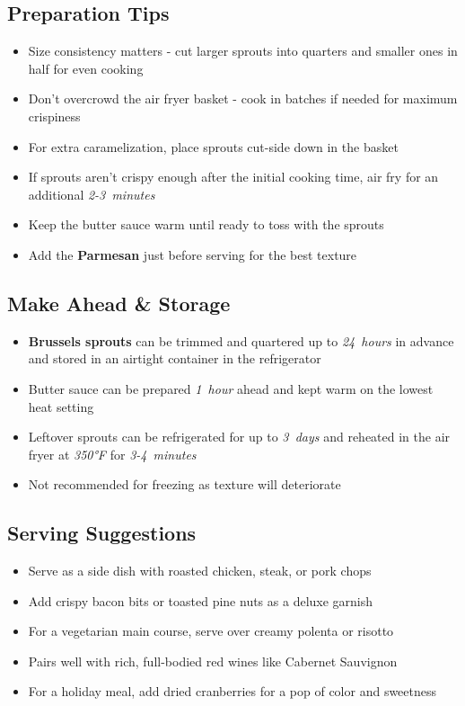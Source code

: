\documentclass[11pt,letterpaper]{article}
\begin{document}
{\begin{multicols}{2}
\subsection*{Preparation Tips}
\begin{itemize}
    \item Size consistency matters - cut larger sprouts into quarters and smaller ones in half for even cooking
    \item Don't overcrowd the air fryer basket - cook in batches if needed for maximum crispiness
    \item For extra caramelization, place sprouts cut-side down in the basket
    \item If sprouts aren't crispy enough after the initial cooking time, air fry for an additional \textit{2-3~minutes}
    \item Keep the butter sauce warm until ready to toss with the sprouts
    \item Add the \textbf{Parmesan} just before serving for the best texture
\end{itemize}

\subsection*{Make Ahead \& Storage}
\begin{itemize}
    \item \textbf{Brussels sprouts} can be trimmed and quartered up to \textit{24~hours} in advance and stored in an airtight container in the refrigerator
    \item Butter sauce can be prepared \textit{1~hour} ahead and kept warm on the lowest heat setting
    \item Leftover sprouts can be refrigerated for up to \textit{3~days} and reheated in the air fryer at \textit{350°F} for \textit{3-4~minutes}
    \item Not recommended for freezing as texture will deteriorate
\end{itemize}

\subsection*{Serving Suggestions}
\begin{itemize}
    \item Serve as a side dish with roasted chicken, steak, or pork chops
    \item Add crispy bacon bits or toasted pine nuts as a deluxe garnish
    \item For a vegetarian main course, serve over creamy polenta or risotto
    \item Pairs well with rich, full-bodied red wines like Cabernet Sauvignon
    \item For a holiday meal, add dried cranberries for a pop of color and sweetness
\end{itemize}

\end{multicols}
}
\end{document}
